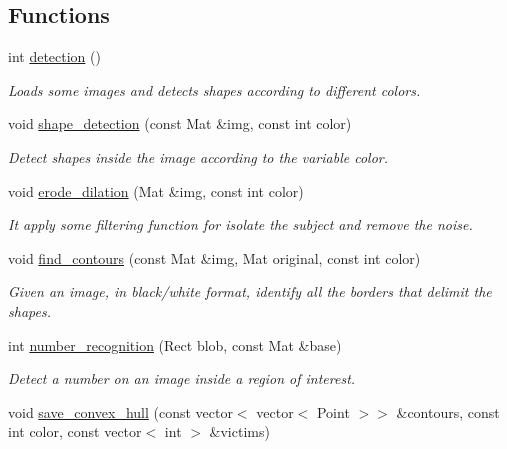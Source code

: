 \subsection*{Functions}
\begin{DoxyCompactItemize}
\item 
int \mbox{\hyperlink{detection_8hh_a17e13c447692201697b084a1906cf6fb}{detection}} ()
\begin{DoxyCompactList}\small\item\em Loads some images and detects shapes according to different colors. \end{DoxyCompactList}\item 
void \mbox{\hyperlink{detection_8hh_a0e5dcc339fb7266424a802866eee62b8}{shape\+\_\+detection}} (const Mat \&img, const int color)
\begin{DoxyCompactList}\small\item\em Detect shapes inside the image according to the variable \textquotesingle{}color\textquotesingle{}. \end{DoxyCompactList}\item 
void \mbox{\hyperlink{detection_8hh_a28d0cdb56cfb2164f939dc2f83d1d9d0}{erode\+\_\+dilation}} (Mat \&img, const int color)
\begin{DoxyCompactList}\small\item\em It apply some filtering function for isolate the subject and remove the noise. \end{DoxyCompactList}\item 
void \mbox{\hyperlink{detection_8hh_a93844a9ac3d8be0bd871bb41f8260330}{find\+\_\+contours}} (const Mat \&img, Mat original, const int color)
\begin{DoxyCompactList}\small\item\em Given an image, in black/white format, identify all the borders that delimit the shapes. \end{DoxyCompactList}\item 
int \mbox{\hyperlink{detection_8hh_a785fcf35ca81d113a1ea3d831fbdbc22}{number\+\_\+recognition}} (Rect blob, const Mat \&base)
\begin{DoxyCompactList}\small\item\em Detect a number on an image inside a region of interest. \end{DoxyCompactList}\item 
void \mbox{\hyperlink{detection_8hh_a923b178671e2272c6b082335d118716a}{save\+\_\+convex\+\_\+hull}} (const vector$<$ vector$<$ Point $>$$>$ \&contours, const int color, const vector$<$ int $>$ \&victims)
$$
\end{DoxyCompactItemize}
